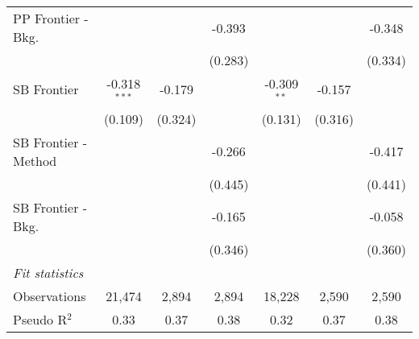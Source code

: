 \begin{tabular}{lcccccc}
   PP Frontier - Bkg.   &                &               & -0.393         &               &               & -0.348\\   
                        &                &               & (0.283)        &               &               & (0.334)\\   
   SB Frontier          & -0.318$^{***}$ & -0.179        &                & -0.309$^{**}$ & -0.157        &   \\   
                        & (0.109)        & (0.324)       &                & (0.131)       & (0.316)       &   \\   
   SB Frontier - Method &                &               & -0.266         &               &               & -0.417\\   
                        &                &               & (0.445)        &               &               & (0.441)\\   
   SB Frontier - Bkg.   &                &               & -0.165         &               &               & -0.058\\   
                        &                &               & (0.346)        &               &               & (0.360)\\   
   \midrule
   \emph{Fit statistics}\\
   Observations         & 21,474         & 2,894         & 2,894          & 18,228        & 2,590         & 2,590\\  
   Pseudo R$^2$         & 0.33           & 0.37          & 0.38           & 0.32          & 0.37          & 0.38\\  
   

\end{tabular}
